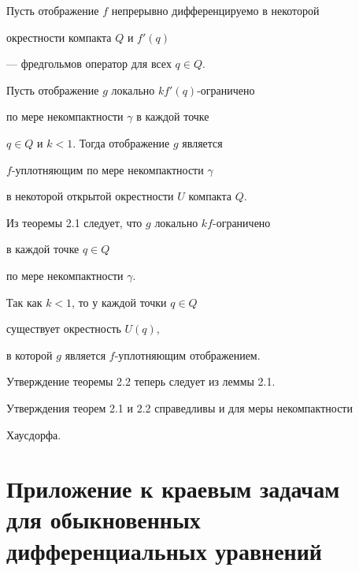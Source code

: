 \begin{thms}


Пусть отображение $f$ непрерывно дифференцируемо в некоторой


окрестности компакта $Q$ и $f' (q)$


--- фредгольмов оператор для всех $q \in Q$.


Пусть отображение $g$ локально $k f' (q)$-ограничено 


по мере некомпактности $\gamma$ в каждой точке 


$q\in Q$ и $k < 1$. Тогда отображение $g$ является


$f$-уплотняющим по мере некомпактности $\gamma$


в некоторой открытой окрестности $U$ компакта $Q$.


\end{thms}





\begin{pf}


Из теоремы 2.1 следует, что $g$ локально $k f$-ограничено 


в каждой точке $q\in Q$ 


по мере некомпактности $\gamma$.


Так как $k < 1$, то у каждой точки $q\in Q$


существует окрестность $U (q)$,


в которой $g$ является $f$-уплотняющим отображением.


Утверждение теоремы 2.2 теперь следует из леммы 2.1.


\end{pf}





\begin{notenonum}


Утверждения теорем 2.1 и 2.2 справедливы и для меры некомпактности


Хаусдорфа. 


\end{notenonum}





\section{Приложение к краевым задачам\protect\\


для обыкновенных дифференциальных уравнений}





